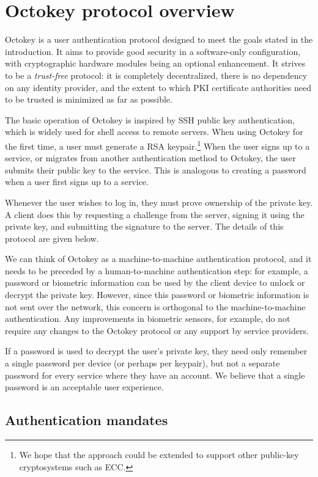\section{Octokey protocol overview}

Octokey is a user authentication protocol designed to meet the goals stated in the introduction. It
aims to provide good security in a software-only configuration, with cryptographic hardware modules
being an optional enhancement. It strives to be a \emph{trust-free} protocol: it is completely
decentralized, there is no dependency on any identity provider, and the extent to which PKI
certificate authorities need to be trusted is minimized as far as possible.

The basic operation of Octokey is inspired by SSH public key authentication, which is widely used
for shell access to remote servers. When using Octokey for the first time, a user must generate a
RSA keypair.\footnote{We hope that the approach could be extended to support other public-key
cryptosystems such as ECC.} When the user signs up to a service, or migrates from another
authentication method to Octokey, the user submits their public key to the service. This is
analogous to creating a password when a user first signs up to a service.

Whenever the user wishes to log in, they must prove ownership of the private key. A client does this
by requesting a challenge from the server, signing it using the private key, and submitting the
signature to the server. The details of this protocol are given below.

We can think of Octokey as a machine-to-machine authentication protocol, and it needs to be preceded
by a human-to-machine authentication step: for example, a password or biometric information can be
used by the client device to unlock or decrypt the private key. However, since this password or
biometric information is not sent over the network, this concern is orthogonal to the
machine-to-machine authentication. Any improvements in biometric sensors, for example, do not
require any changes to the Octokey protocol or any support by service providers.

If a password is used to decrypt the user's private key, they need only remember a single password
per device (or perhaps per keypair), but not a separate password for every service where they have
an account. We believe that a single password is an acceptable user experience.

\subsection{Authentication mandates}

